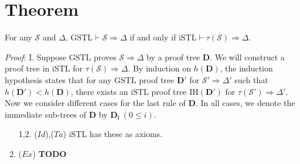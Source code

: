 \section{Theorem} For any $\mathcal{S}$ and $\Delta$, $\text{GSTL} \vdash \mathcal{S} \Rightarrow \Delta$ if and only if $\text{iSTL} \vdash \tau(\mathcal{S}) \Rightarrow \Delta$.

\emph{Proof}: I. Suppose $\text{GSTL}$ proves $\mathcal{S} \Rightarrow \Delta$ by a proof tree $\mathbf{D}$. We will construct a proof tree in $\text{iSTL}$ for $\tau(\mathcal{S}) \Rightarrow \Delta$. By induction on $h(\mathbf{D})$, the induction hypothesis states that for any $\text{GSTL}$ proof tree $\mathbf{D}'$ for $\mathcal{S}' \Rightarrow \Delta'$ such that $h(\mathbf{D}') < h(\mathbf{D})$, there exists an $\text{iSTL}$ proof tree IH$(\mathbf{D'})$ for $\tau(\mathcal{S}') \Rightarrow \Delta'$. Now we consider different cases for the last rule of $\mathbf{D}$. In all cases, we denote the immediate sub-trees of $\mathbf{D}$ by $\mathbf{D_i} ~(0 \leq i)$.
\begin{enumerate}
	\item[1,2.] ($Id$),($Ta$) iSTL has these as axioms.
	\setcounter{enumi}{2}
	\item ($Ex$) {\color{red}\textbf{TODO}}
\end{enumerate}
